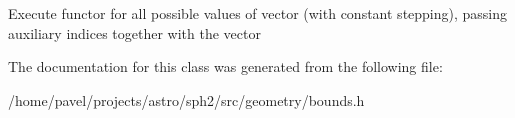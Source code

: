 Execute functor for all possible values of vector (with constant stepping), passing auxiliary indices together with the vector 

The documentation for this class was generated from the following file\+:\begin{DoxyCompactItemize}
\item 
/home/pavel/projects/astro/sph2/src/geometry/bounds.\+h\end{DoxyCompactItemize}
